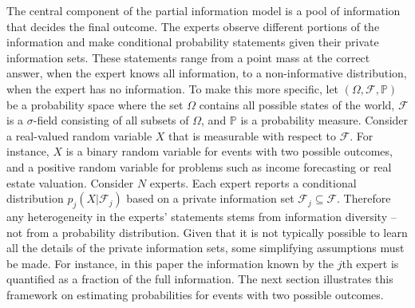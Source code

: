 \documentclass[11pt,twoside]{article}
\renewcommand{\P}{\mathbb{P}}
\theoremstyle{definition}
\theoremstyle{definition}
\begin{document}
The central component of the partial information model is a pool of information that decides the final outcome. The experts observe different portions of the information and make conditional probability statements given their private information sets. These statements range from a point mass at the correct answer, when the expert knows all information, to a non-informative distribution, when the expert has no information. To make this more specific, let  $(\Omega, \mathcal{F}, \P)$ be a probability space where the set $\Omega$ contains all possible states of the world,  $\mathcal{F}$ is a $\sigma$-field consisting of all subsets of $\Omega$, and $\P$ is a probability measure. Consider a real-valued random variable $X$ that is measurable with respect to $\mathcal{F}$. For instance, $X$ is a binary random variable for events with two possible outcomes, and a positive random variable for problems such as income forecasting or real estate valuation. Consider $N$ experts. Each expert reports a conditional distribution $p_j\left(X | \mathcal{F}_j\right)$ based on a private information set $\mathcal{F}_j \subseteq \mathcal{F}$. 
Therefore any heterogeneity in the experts' statements stems from information diversity -- not from a probability distribution. Given that it is not typically possible to learn all the details of the private information sets, some simplifying assumptions must be made. For instance, in this paper the information known by the $j$th expert is quantified as a fraction of the full information.  The next section illustrates this framework on estimating probabilities for events with two possible outcomes. 
\end{document}
